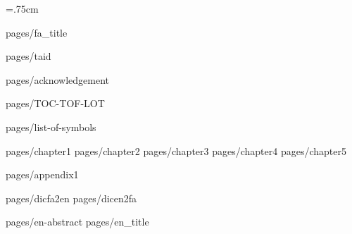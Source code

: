 \documentclass[
			   oneside,
			   phd,
			   12pt
			   ]{AUTthesis}
\begin{document}
	\baselineskip=.75cm
	\linespread{1.75}

	 {pages/fa_title}
	
	 {pages/taid}
	
	 {pages/acknowledgement}
	
	
	 {pages/TOC-TOF-LOT}
	
	 {pages/list-of-symbols}
	
	\pagestyle{style1}
	
	 {pages/chapter1}
	 {pages/chapter2}
	 {pages/chapter3}
	 {pages/chapter4}
	 {pages/chapter5}
	

	\chapterfont{\vspace*{-2em}\centering\LARGE}%
	
	\appendix
	
	
	 {pages/appendix1}

	\parindent=0pt
	 {pages/dicfa2en}
	 {pages/dicen2fa}

	\pagestyle{style7}
	\printindex
	\pagestyle{style7}
	 {pages/en-abstract}
	 {pages/en_title}
	
\end{document}
